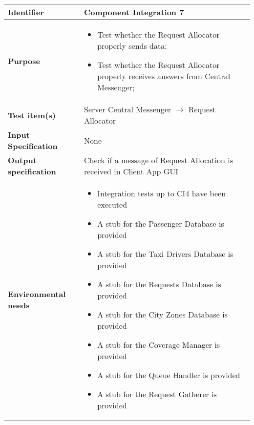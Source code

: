 \begin{center}
\begin{tabular}{lp{}}
\toprule
\textbf{Identifier}		&	Component Integration 7\\
\midrule
\textbf{Purpose}		&	\begin{itemize}
					\item Test whether the Request Allocator properly sends data;
					\item Test whether the Request Allocator properly receives answers from Central Messenger;
					\end{itemize}	\\
\textbf{Test item(s)}	&	Server Central Messenger $\rightarrow$ Request Allocator\\
\textbf{Input Specification}	&	None\\
\textbf{Output specification}	&	Check if a message of Request Allocation is received in Client App GUI\\
\textbf{Environmental needs}	&	\begin{itemize}
							\item Integration tests up to CI4 have been executed
							\item A stub for the Passenger Database is provided
							\item A stub for the Taxi Drivers Database is provided
							\item A stub for the Requests Database is provided
							\item A stub for the City Zones Database is provided
							\item A stub for the Coverage Manager is provided
							\item A stub for the Queue Handler is provided
							\item A stub for the Request Gatherer is provided
							\end{itemize}	\\
\bottomrule
\end{tabular}
\end{center}




